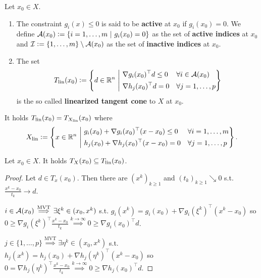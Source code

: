 \begin{definition}\label{def1.5}
    Let \(x_0 \in X\).
    \begin{enumerate}
        \item The constraint \(g_i(x) \le 0\) is said to be \textbf{active} at \(x_0\) if \(g_i(x_0) = 0\). We define \(\mathcal{A}(x_0) \mathrel{\mathop:}= \left\{ i = 1, \dots, m \ \middle| \ g_i(x_0) = 0 \right\}\) as the set of \textbf{active indices} at \(x_0\) and \(\mathcal{I} \mathrel{\mathop:}= \{1, \dots, m\} \setminus \mathcal{A}(x_0)\) as the set of \textbf{inactive indices} at \(x_0\).
        \item The set \[T_{\operatorname{lin}}(x_0) \mathrel{\mathop:}= \left\{ d \in \mathbb{R}^n \ \middle| \ \begin{aligned} &\nabla g_i(x_0)^\top d \le 0 &&\forall i \in \mathcal{A}(x_0) \\ &\nabla h_j(x_0)^\top d = 0 &&\forall j = 1,\dots,p \end{aligned} \right\}\] is the so called \textbf{linearized tangent cone} to \(X\) at \(x_0\).
    \end{enumerate}
\end{definition}

\begin{remark}\label{rem1.6}
    It holds \(T_{\operatorname{lin}}(x_0) = T_{X_\mathrm{lin}}(x_0)\) where \[X_\mathrm{lin} \mathrel{\mathop:}= \left\{ x \in \mathbb{R}^n \ \middle| \ \begin{aligned} & g_i(x_0) + \nabla g_i(x_0)^\top (x - x_0) \le 0 && \forall i = 1,\dots,m \\ & h_j(x_0) + \nabla h_j(x_0)^\top (x - x_0) = 0 && \forall j = 1,\dots,p \end{aligned} \right\}.\]
\end{remark}

\begin{lemma}\label{lem1.7}
    Let \(x_0 \in X\). It holds \(T_X(x_0) \subseteq T_{\operatorname{lin}}(x_0)\).
\end{lemma}
\begin{proof}
    Let \(d \in T_x(x_0)\). Then there are \((x^k)_{k \ge 1}\) and \((t_k)_{k \ge 1} \searrow 0\) s.t. \(\frac{x^k - x_0}{t_k} \to d\).

    \(i \in \mathcal{A}(x_0) \stackrel{\mathrm{MVT}}{\implies} \exists \xi^k \in (x_0, x^k)\) s.t. \(g_i(x^k) = g_i(x_0) + \nabla g_i(\xi^k)^\top (x^k - x_0)\) so \(0 \ge \nabla g_i(\xi^k)^\top \frac{x^k - x_0}{t_k} \stackrel{k \to \infty}{\implies} 0 \ge \nabla g_i(x_0)^\top d\).

    \(j \in \{1,\dots,p\} \stackrel{\mathrm{MVT}}{\implies} \exists \eta^k \in (x_0, x^k)\) s.t. \(h_j(x^k) = h_j(x_0) + \nabla h_j(\eta^k)^\top (x^k - x_0)\) so \(0 = \nabla h_j(\eta^k)^\top \frac{x^k - x_0}{t_k} \stackrel{k \to \infty}{\implies} 0 \ge \nabla h_j(x_0)^\top d\).
\end{proof}

